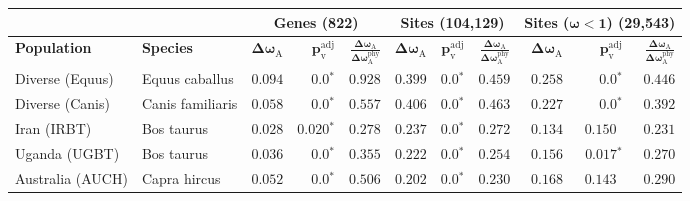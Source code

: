 \documentclass{article}
\begin{document}
    \begin{table*}[!ht]
        \centering
    \begin{adjustbox}{width = 1\textwidth}
            \begin{tabular}{||l|l||r|r|r||r|r|r||r|r|r||}
                \toprule
                \multicolumn{2}{||c||}{} &
                \multicolumn{3}{c||}{\textbf{Genes (822)}} &
                \multicolumn{3}{c||}{\textbf{Sites (104,129)}} &
                \multicolumn{3}{c||}{\textbf{Sites ($\bm{\omega < 1}$) (29,543)}}
                \\ \hline
                \textbf{Population} &
                \textbf{Species} &
                $\bm{\Delta \omega_{\mathrm{A}}}$ &
                $\bm{p_{\mathrm{v}}^{\mathrm{adj}}}$    &
                $\bm{\frac{\Delta\omega_{\mathrm{A}}}{\Delta\omega_{\mathrm{A}}^{\mathrm{phy}}}}$ &
                $\bm{\Delta \omega_{\mathrm{A}}}$ &
                $\bm{p_{\mathrm{v}}^{\mathrm{adj}}}$          &
                $\bm{\frac{\Delta\omega_{\mathrm{A}}}{\Delta\omega_{\mathrm{A}}^{\mathrm{phy}}}}$ &
                $\bm{\Delta \omega_{\mathrm{A}}}$ &
                $\bm{p_{\mathrm{v}}^{\mathrm{adj}}}$ &
                $\bm{\frac{\Delta\omega_{\mathrm{A}}}{\Delta\omega_{\mathrm{A}}^{\mathrm{phy}}}}$
                \\                \midrule
                Diverse (Equus)                                     & Equus caballus      & $ 0.094$ & $\bm{0.0{^*}}$    & $ 0.928$ & $ 0.399$ & $\bm{0.0{^*}}$ & $ 0.459$ & $ 0.258$ & $\bm{0.0{^*}}$ & $ 0.446$ \\
                \rowcolor{LIGHTGREY} Diverse (Canis)                & Canis familiaris    & $ 0.058$ & $\bm{0.0{^*}}$    & $ 0.557$                                                                     & $ 0.406$                      & $\bm{0.0{^*}}$ & $ 0.463$ & $ 0.227$ & $\bm{0.0{^*}}$ & $ 0.392$ \\
                Iran (IRBT)                                         & Bos taurus          & $ 0.028$ & $\bm{ 0.020{^*}}$ & $ 0.278$ & $ 0.237$ & $\bm{0.0{^*}}$ & $ 0.272$ & $ 0.134$ & $ 0.150~~$ & $ 0.231$ \\
                Uganda (UGBT)                                       & Bos taurus          & $ 0.036$ & $\bm{0.0{^*}}$    & $ 0.355$ & $ 0.222$ & $\bm{0.0{^*}}$ & $ 0.254$ & $ 0.156$ & $\bm{ 0.017{^*}}$ & $ 0.270$ \\
                \rowcolor{LIGHTGREY} Australia (AUCH)               & Capra hircus        & $ 0.052$ & $\bm{0.0{^*}}$    & $ 0.506$                                                                     & $ 0.202$                      & $\bm{0.0{^*}}$ & $ 0.230$ & $ 0.168$ & $ 0.143~~$ & $ 0.290$ \\

\end{tabular}
\end{adjustbox}
\end{table*}
\end{document}
